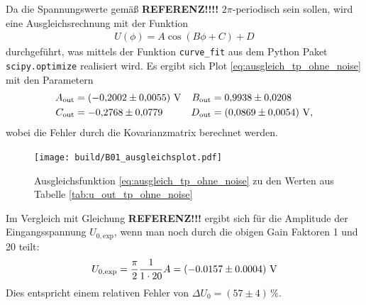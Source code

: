 \noindent
Da die Spannungswerte gemäß \textbf{REFERENZ!!!!} $2 \pi$-periodisch sein sollen, wird eine Ausgleichsrechnung mit der Funktion 
\begin{align}
    \label{eq:ausgleich_tp_ohne_noise}
    U(\phi) = A \cos{\left(B \phi + C\right)} + D 
\end{align}
durchgeführt, was mittels der Funktion \texttt{curve\_fit} aus dem Python \cite{python} Paket \texttt{scipy.optimize} \cite[]{scipy} realisiert wird.
Es ergibt sich Plot \ref{eq:ausgleich_tp_ohne_noise} mit den Parametern
\begin{align*}
    A_\text{out} &= \left(\num[]{-0.2002} \pm \num[]{0.0055}\right) \, \unit{\volt} & B_\text{out} &=  \num[]{0.9938} \pm \num[]{0.0208} \\
    C_\text{out} &= \num[]{-0.2768} \pm \num[]{0.0779} & D_\text{out} &= \left(\num[]{0.0869} \pm \num[]{0.0054}\right) \, \unit[]{\volt},
\end{align*}
wobei die Fehler durch die Kovarianzmatrix berechnet werden.
%
\begin{figure}[H]
    \texttt{[image: build/B01\_ausgleichsplot.pdf]}
    \caption[]{Ausgleichsfunktion \eqref{eq:ausgleich_tp_ohne_noise} zu den Werten aus Tabelle \ref{tab:u_out_tp_ohne_noise}}
    \label{fig:ausgleichsplot1}
\end{figure}

\noindent
Im Vergleich mit Gleichung \textbf{REFERENZ!!!} ergibt sich für die Amplitude der Eingangsspannung $U_{0,\text{exp}}$,
wenn man noch durch die obigen Gain Faktoren 1 und 20 teilt:
\begin{align*}
    U_{0,\text{exp}} = \frac{\pi}{2} \frac{1}{1 \cdot 20} A = \left(-0.0157 \pm 0.0004\right) \, \unit[]{\volt}
\end{align*}
Dies entspricht einem relativen Fehler von $\Delta U_0 = \left(57 \pm 4\right) \, \%$.


